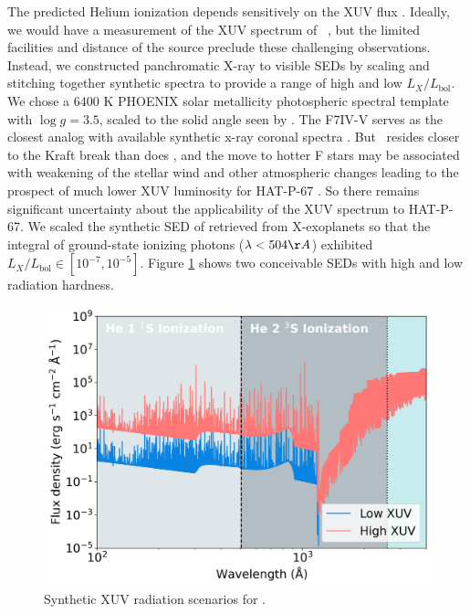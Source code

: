 \documentclass[twocolumn]{aastex631}
\newcommand{\hatp}{\object{HAT-P-67}~}
\newcommand{\hatpb}{\object{HAT-P-67 b}}
\begin{document}
The predicted Helium ionization depends sensitively on the XUV flux \citep{2019ApJ...881..133O}.  Ideally, we would have a measurement of the XUV spectrum of \hatp, but the limited facilities and distance of the source preclude these challenging observations.  Instead, we constructed panchromatic X-ray to visible SEDs by scaling and stitching together synthetic spectra to provide a range of high and low $L_X/L_\mathrm{bol}$.  We chose a 6400 K PHOENIX \citep{husser13} solar metallicity photospheric spectral template with $\log{g}=3.5$, scaled to the solid angle seen by \hatpb.  The F7IV-V  serves as the closest analog with available synthetic x-ray coronal spectra \citep{2011A&A...532A...6S}.  But \hatp resides closer to the Kraft break than does , and the move to hotter F stars may be associated with weakening of the stellar wind and other atmospheric changes leading to the prospect of much lower XUV luminosity for HAT-P-67 \citep{2022ApJ...930....7A}.  So there remains significant uncertainty about the applicability of the  XUV spectrum to HAT-P-67.  We scaled the synthetic SED of  retrieved from X-exoplanets \citep{2011A&A...532A...6S} so that the integral of ground-state ionizing photons ($\lambda<504\AA$) exhibited $L_X/L_\mathrm{bol} \in [10^{-7}, 10^{-5}]$.  Figure \ref{fig:XUV} shows two conceivable SEDs with high and low radiation hardness.

\begin{figure}
    \includegraphics[width=\linewidth]{figures/XUV_flux_schematic.png}
    \caption{Synthetic XUV radiation scenarios for \hatpb.  }
    \label{fig:XUV}
\end{figure}
\end{document}
